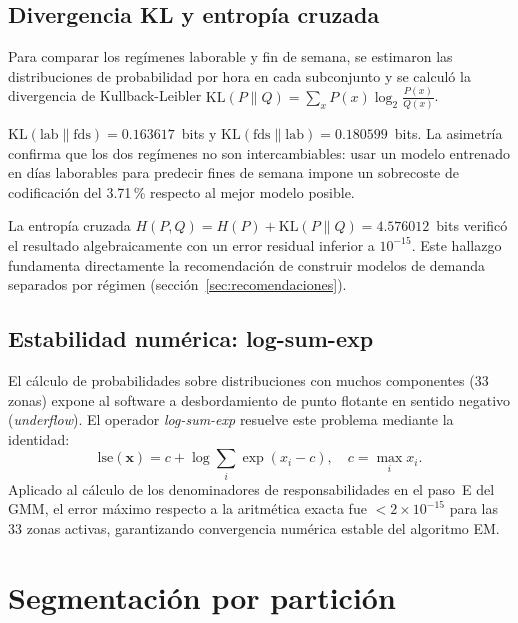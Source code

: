 \documentclass[12pt, a4paper]{article}
\begin{document}
\subsection{Divergencia KL y entropía cruzada}

Para comparar los regímenes laborable y fin de semana, se estimaron las distribuciones de probabilidad por hora en cada subconjunto y se calculó la divergencia de Kullback-Leibler $\text{KL}(P\!\parallel\! Q) = \sum_x P(x)\log_2\!\frac{P(x)}{Q(x)}$.

\begin{hallazgo}
$\text{KL}(\text{lab}\!\parallel\!\text{fds}) = 0{.}163617$~bits y $\text{KL}(\text{fds}\!\parallel\!\text{lab}) = 0{.}180599$~bits. La asimetría confirma que los dos regímenes no son intercambiables: usar un modelo entrenado en días laborables para predecir fines de semana impone un sobrecoste de codificación del 3{.}71\,\% respecto al mejor modelo posible.
\end{hallazgo}

La entropía cruzada $H(P,Q) = H(P) + \text{KL}(P\!\parallel\! Q) = 4{.}576012$~bits verificó el resultado algebraicamente con un error residual inferior a $10^{-15}$. Este hallazgo fundamenta directamente la recomendación de construir modelos de demanda separados por régimen (sección~\ref{sec:recomendaciones}).

\subsection{Estabilidad numérica: log-sum-exp}

El cálculo de probabilidades sobre distribuciones con muchos componentes (33 zonas) expone al software a desbordamiento de punto flotante en sentido negativo (\emph{underflow}). El operador \emph{log-sum-exp} resuelve este problema mediante la identidad:
\[
  \mathrm{lse}(\mathbf{x}) = c + \log\!\sum_{i} \exp(x_i - c), \quad c = \max_i x_i.
\]
Aplicado al cálculo de los denominadores de responsabilidades en el paso~E del GMM, el error máximo respecto a la aritmética exacta fue $< 2\times10^{-15}$ para las 33 zonas activas, garantizando convergencia numérica estable del algoritmo EM.

\section{Segmentación por partición}
\label{sec:clustering}
\end{document}
